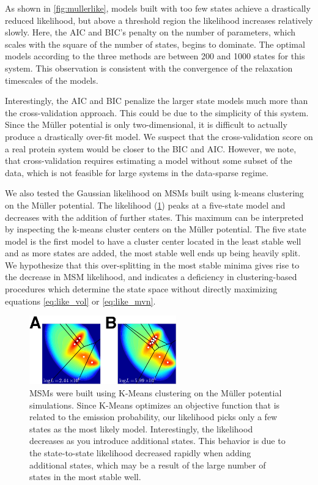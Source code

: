\documentclass[twocolumn,floatfix,nofootinbib,aps]{revtex4-1}
\begin{document}
As shown in \cref{fig:mullerlike}, models built with too few states achieve a drastically reduced likelihood, but above a threshold region the likelihood increases relatively slowly. Here, the AIC and BIC's penalty on the number of parameters, which scales with the square of the number of states, begins to dominate. The optimal models according to the three methods are between 200 and 1000 states for this system. This observation is consistent with the convergence of the relaxation timescales of the models.

Interestingly, the AIC and BIC penalize the larger state models much more than the cross-validation approach. This could be due to the simplicity of this system. Since the M\"uller potential is only two-dimensional, it is difficult to actually produce a drastically over-fit model. We suspect that the cross-validation score on a real protein system would be closer to the BIC and AIC. However, we note, that cross-validation requires estimating a model without some subset of the data, which is not feasible for large systems in the data-sparse regime.

We also tested the Gaussian likelihood on MSMs built using k-means clustering on the M\"uller potential. The likelihood (\cref{fig:kmeans_mull}) peaks at a five-state model and decreases with the addition of further states. This maximum can be interpreted by inspecting the k-means cluster centers on the M\"uller potential. The five state model is the first model to have a cluster center located in the least stable well and as more states are added, the most stable well ends up being heavily split. We hypothesize that this over-splitting in the most stable minima gives rise to the decrease in MSM likelihood, and indicates a deficiency in clustering-based procedures which determine the state space without directly maximizing equations \ref{eq:like_vol} or \ref{eq:like_mvn}.

\begin{figure}
\centering
\includegraphics[width=2.5in]{figs_final/kmeans_like2_lbl.png}
\caption{MSMs were built using K-Means clustering on the M\"uller potential simulations. Since K-Means optimizes an objective function that is related to the emission probability, our likelihood picks only a few states as the most likely model. Interestingly, the likelihood decreases as you introduce additional states. This behavior is due to the state-to-state likelihood decreased rapidly when adding additional states, which may be a result of the large number of states in the most stable well.}
\label{fig:kmeans_mull}
\end{figure}
\end{document}
